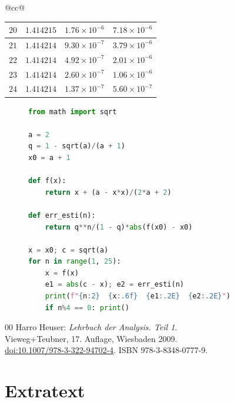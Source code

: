 \documentclass[
  a4paper, 10pt, fleqn, twoside, twocolumn,
  abstract=true
]{scrartcl}
\theoremstyle{plain}
\theoremstyle{definition}
\begin{document}
\begin{table}
\begin{center}
\begin{tabular}{@{}cc@{}}
\begin{tabular}{rccc}
$20$ & $1.414215$ & $1.76\times 10^{-6}$ & $7.18\times 10^{-6}$\\
\midrule
$21$ & $1.414214$ & $9.30\times 10^{-7}$ & $3.79\times 10^{-6}$\\
$22$ & $1.414214$ & $4.92\times 10^{-7}$ & $2.01\times 10^{-6}$\\
$23$ & $1.414214$ & $2.60\times 10^{-7}$ & $1.06\times 10^{-6}$\\
$24$ & $1.414214$ & $1.37\times 10^{-7}$ & $5.60\times 10^{-7}$\\
\bottomrule
\end{tabular}
\end{tabular}
\end{center}
\end{table}

\begin{figure}
\begin{lstlisting}[language=Python,
caption={Berechnungsverfahren}, label={lst:Berechnung}]
from math import sqrt

a = 2
q = 1 - sqrt(a)/(a + 1)
x0 = a + 1

def f(x):
    return x + (a - x*x)/(2*a + 2)

def err_esti(n):
    return q**n/(1 - q)*abs(f(x0) - x0)

x = x0; c = sqrt(a)
for n in range(1, 25):
    x = f(x)
    e1 = abs(c - x); e2 = err_esti(n)
    print(f"{n:2}  {x:.6f}  {e1:.2E}  {e2:.2E}")
    if n%4 == 0: print()
\end{lstlisting}
\end{figure}

\begin{thebibliography}{00}
 Harro Heuser: \emph{Lehrbuch der Analysis. Teil 1}.\\
  Vieweg+Teubner, 17. Auflage, Wiesbaden 2009.\\
  {\small\href{https://doi.org/10.1007/978-3-322-94702-4}{doi:10.1007/978-3-322-94702-4}.
  ISBN 978-3-8348-0777-9.}
\end{thebibliography}

\section*{Extratext}

\lipsum[1-43]
\end{document}
